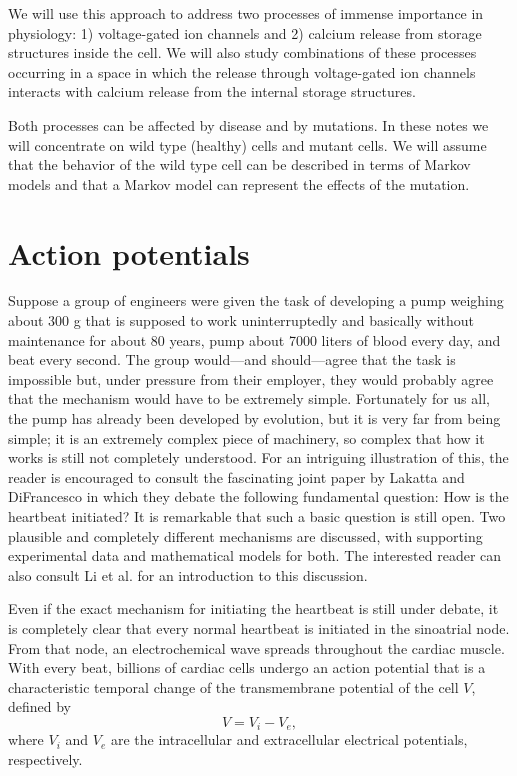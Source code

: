 We will use this approach to address two processes of immense importance in physiology: 
1) voltage-gated ion channels and 2) calcium release from storage structures inside the cell. We will also study combinations of these processes occurring in a space in which the release through voltage-gated ion channels interacts with calcium release from the internal storage structures.

Both processes can be affected by disease and by mutations. In these notes we will concentrate on wild type (healthy) cells and mutant cells. We will assume that the behavior of the wild type cell can be described in terms of Markov models  and that a Markov model can represent the effects of the mutation. 

\section{Action potentials}

Suppose a group of engineers were given the task of developing a pump weighing about 300 g that is supposed to work uninterruptedly and basically without maintenance for about 80 years, pump about 7000 liters of blood every day, and beat every second. The group would---and should---agree that the task is impossible but, under pressure from their employer, they would probably agree that the mechanism would have to be extremely simple. Fortunately for us all, the pump has already been developed by evolution, but it is very far from being simple; it is an extremely complex piece of machinery, so complex that how it works  is still not completely understood. For an intriguing illustration of this, the reader is encouraged to consult the fascinating joint paper by Lakatta and DiFrancesco \cite{Lakatta2009} in which they debate the following fundamental question: How is the heartbeat initiated? It is remarkable that such a basic question is still open. Two plausible and completely different mechanisms are discussed, with supporting experimental data and mathematical models for both. The interested reader can also consult Li et al. \cite{Li2013} for an introduction to this discussion.

Even if the exact mechanism for initiating the heartbeat is still under debate, it is completely clear that every normal heartbeat is initiated in the sinoatrial node. From that node, an electrochemical wave spreads throughout the cardiac muscle. With every beat, billions of cardiac cells undergo an action potential that is a characteristic temporal change of the transmembrane potential of the cell $V$, defined by
\[ V = V_i-V_e, \]
where $V_i$ and $V_e$ are the intracellular and extracellular electrical potentials, respectively. 

